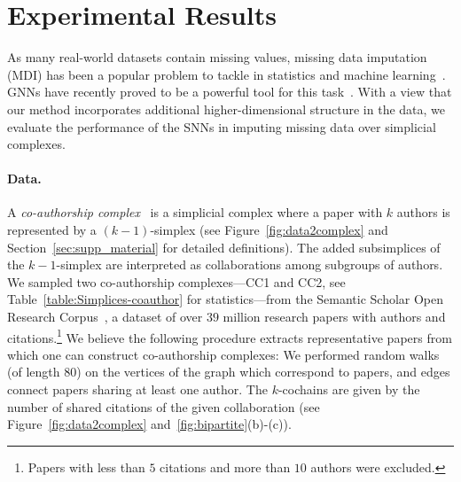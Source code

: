 \section{Experimental Results}

As many real-world datasets contain missing values, missing data imputation (MDI) has been a popular problem to tackle in statistics and machine learning~\cite{little1986statistical, nelwamondo2007missing}.
GNNs have recently proved to be a powerful tool for this task~\cite{spinelli2020neural}.
With a view that our method incorporates additional higher-dimensional structure in the data, we evaluate the performance of the SNNs in imputing missing data over simplicial complexes.

\paragraph{Data.}
A \emph{co-authorship complex}~\cite{patania2017} is a simplicial complex where a paper with $k$ authors is represented by a $(k-1)$-simplex (see Figure~\ref{fig:data2complex} and Section~\ref{sec:supp_material} for detailed definitions).
The added subsimplices of the $k-1$-simplex are interpreted as collaborations among subgroups of authors.
We sampled two co-authorship complexes---CC1 and CC2, see Table~\ref{table:Simplices-coauthor} for statistics---from the Semantic Scholar Open Research Corpus~\cite{ammar18NAACL}, a dataset of over $39$ million research papers with authors and citations.\footnote{Papers with less than $5$ citations and more than $10$ authors were excluded.}
We believe the following procedure extracts representative papers from which one can construct co-authorship complexes: We performed random walks (of length $80$) on the vertices of the graph which correspond to papers, and edges connect papers sharing at least one author.
The $k$-cochains are given by the number of shared citations of the given collaboration (see Figure~\ref{fig:data2complex} and~\ref{fig:bipartite}(b)-(c)).

